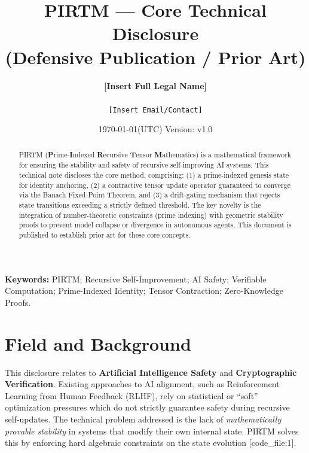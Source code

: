 \documentclass[11pt, a4paper]{article}
\title{\textbf{PIRTM --- Core Technical Disclosure}\\ \large(Defensive Publication / Prior Art)}
\author{
  \textbf{[Insert Full Legal Name]} \\
  [Insert Affiliation/Organization] \\
  \texttt{[Insert Email/Contact]}
}
\date{\today \quad (UTC) \quad Version: v1.0}
\begin{document}
\maketitle

\begin{abstract}
\noindent PIRTM (\textbf{P}rime-\textbf{I}ndexed \textbf{R}ecursive \textbf{T}ensor \textbf{M}athematics) is a mathematical framework for ensuring the stability and safety of recursive self-improving AI systems. This technical note discloses the core method, comprising: (1) a prime-indexed genesis state for identity anchoring, (2) a contractive tensor update operator guaranteed to converge via the Banach Fixed-Point Theorem, and (3) a drift-gating mechanism that rejects state transitions exceeding a strictly defined threshold. The key novelty is the integration of number-theoretic constraints (prime indexing) with geometric stability proofs to prevent model collapse or divergence in autonomous agents. This document is published to establish prior art for these core concepts.
\end{abstract}

\vspace{0.5em}
\noindent\textbf{Keywords:} PIRTM; Recursive Self-Improvement; AI Safety; Verifiable Computation; Prime-Indexed Identity; Tensor Contraction; Zero-Knowledge Proofs.

\section{Field and Background}
This disclosure relates to \textbf{Artificial Intelligence Safety} and \textbf{Cryptographic Verification}. Existing approaches to AI alignment, such as Reinforcement Learning from Human Feedback (RLHF), rely on statistical or ``soft'' optimization pressures which do not strictly guarantee safety during recursive self-updates. The technical problem addressed is the lack of \emph{mathematically provable stability} in systems that modify their own internal state. PIRTM solves this by enforcing hard algebraic constraints on the state evolution [code\_file:1].
\end{document}
